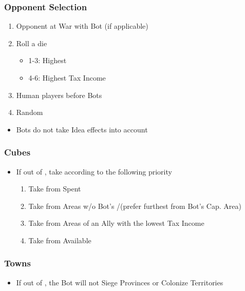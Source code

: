 \documentclass[10pt]{article}
\begin{document}
\subsubsection*{Opponent Selection}
\begin{enumerate}
	\item Opponent at War with Bot (if applicable)
	\item Roll a die
	\begin{itemize}
		\item 1-3: Highest \prestige
		\item 4-6: Highest Tax Income
	\end{itemize}
	\item Human players before Bots
	\item Random	
\end{enumerate}

\begin{itemize}
	\item Bots do not take Idea effects into account
\end{itemize}

\subsubsection*{Cubes}
\begin{itemize}
	\item If out of \cubes, take according to the following priority
	\begin{enumerate}
		\item Take \cubes from Spent \botpower
		\item Take \influence from Areas w/o Bot's \alliance/\marriage (prefer furthest from Bot's Cap. Area)
		\item Take from Areas of an Ally with the lowest Tax Income
		\item Take from Available \botpower
	\end{enumerate}
\end{itemize}

\subsubsection*{Towns}
\begin{itemize}
	\item If out of \towns, the Bot will not Siege Provinces or Colonize Territories
\end{itemize}
\end{document}
